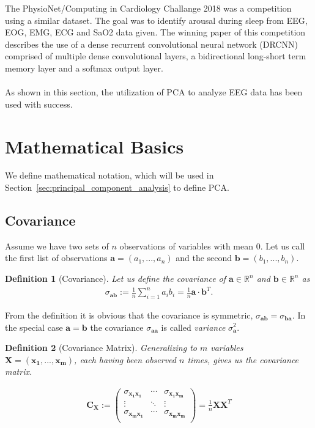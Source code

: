 \documentclass[a4paper]{IEEEtran}
\newtheorem{definition}{Definition}
\begin{document}
The PhysioNet/Computing in Cardiology Challange 2018\cite{Ghassemi2018} was a competition using a similar dataset. The goal was to identify arousal during sleep from EEG, EOG, EMG, ECG and SaO2 data given. The winning paper\cite{Howe2018} of this competition describes the use of a dense recurrent convolutional neural network (DRCNN) comprised of multiple dense convolutional layers, a bidirectional long-short term memory layer and a softmax output layer.
\\
\\
As shown in this section, the utilization of PCA to analyze EEG data has been used with success.

\section{Mathematical Basics}
\label{sec:mathematical_basics}

We define mathematical notation, which will be used in Section~\ref{sec:principal_component_analysis} to define PCA.

\subsection{Covariance}
Assume we have two sets of $n$ observations of variables with mean $0$. Let us call the first list of observations $\mathbf{a} = (a_1, ..., a_n)$ and the second $\mathbf{b} = (b_1, ..., b_n)$.

\begin{definition}[Covariance]
Let us define the \textit{covariance} of $\mathbf{a} \in \mathbb{R}^n$ and $\mathbf{b} \in \mathbb{R}^n$ as
\begin{align*}
	\sigma_{\mathbf{ab}} := \frac{1}{n} \sum_{i=1}^{n}a_ib_i = \frac{1}{n}\mathbf{a}\cdot\mathbf{b}^T.
\end{align*}
\end{definition}

From the definition it is obvious that the covariance is symmetric, $\sigma_{\mathbf{ab}} = \sigma_{\mathbf{ba}}$. In the special case $\mathbf{a} = \mathbf{b}$ the covariance $\sigma_{\mathbf{aa}}$ is called \textit{variance} $\sigma_{\mathbf{a}}^2$.

\begin{definition}[Covariance Matrix]
Generalizing to $m$ variables $\mathbf{X} = (\mathbf{x_1}, ..., \mathbf{x_m})$, each having been observed $n$ times, gives us the \textit{covariance matrix}.

\begin{align*}
	\mathbf{C_X} := \left(\begin{matrix}
		\sigma_{\mathbf{x_1x_1}}	& \cdots & \sigma_{\mathbf{x_1x_m}}	\\
		\vdots						& \ddots & \vdots					\\
		\sigma_{\mathbf{x_mx_1}}	& \cdots & \sigma_{\mathbf{x_mx_m}}	\\
	\end{matrix}\right) = \frac{1}{n} \mathbf{X}\mathbf{X}^T
\end{align*}
\end{definition}
\end{document}
